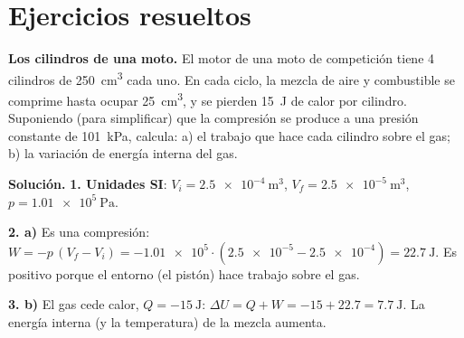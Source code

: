 
\section{Ejercicios resueltos}\label{sec:ud13-resueltos}

\begin{example}
    \textbf{Los cilindros de una moto.} El motor de una moto de competición tiene 4 cilindros de \qty{250}{\cm\cubed} cada uno. En
    cada ciclo, la mezcla de aire y combustible se comprime hasta ocupar \qty{25}{\cm\cubed}, y se pierden \qty{15}{\joule} de calor
    por cilindro. Suponiendo (para simplificar) que la compresión se produce a una presión constante de \qty{101}{\kilo\pascal},
    calcula: a) el trabajo que hace cada cilindro sobre el gas; b) la variación de energía interna del gas.

    \textbf{Solución.} \textbf{1. Unidades SI}: \(V_i = \qty{2.5e-4}{\m\cubed}\), \(V_f = \qty{2.5e-5}{\m\cubed}\),
    \(p = \qty{1.01e5}{\pascal}\).

    \textbf{2. a)} Es una compresión:
    \(W = -p\,(V_f - V_i) = -\num{1.01e5} \cdot (\num{2.5e-5} - \num{2.5e-4}) = \qty{+22.7}{\joule}\). Es positivo porque el
    entorno (el pistón) hace trabajo sobre el gas.

    \textbf{3. b)} El gas cede calor, \(Q = \qty{-15}{\joule}\):
    \(\Delta U = Q + W = -15 + \num{22.7} = \qty{+7.7}{\joule}\). La energía interna (y la temperatura) de la mezcla aumenta.
\end{example}

